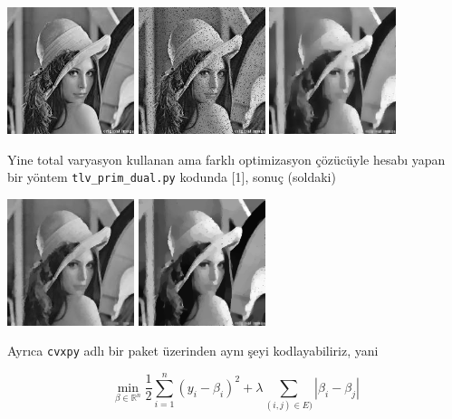 \documentclass[12pt,fleqn]{article}\usepackage{../../common}
\begin{document}
\includegraphics[width=10em]{lenad0.jpg}
\includegraphics[width=10em]{lenad1.jpg}
\includegraphics[width=10em]{lenad2.jpg}

Yine total varyasyon kullanan ama farklı optimizasyon çözücüyle hesabı
yapan bir yöntem \verb!tlv_prim_dual.py! kodunda [1], sonuç (soldaki)

\includegraphics[width=10em]{lenad3.jpg}
\includegraphics[width=10em]{lenad4.jpg}

Ayrıca \verb!cvxpy! adlı bir paket üzerinden aynı şeyi kodlayabiliriz, yani 

$$
\min_{\beta \in \mathbb{R}^n} 
\frac{1}{2} \sum_{i=1}^{n} (y_i - \beta_i)^2 + 
\lambda \sum_{(i,j) \in E)}  |\beta_i - \beta_j|
$$
\end{document}
